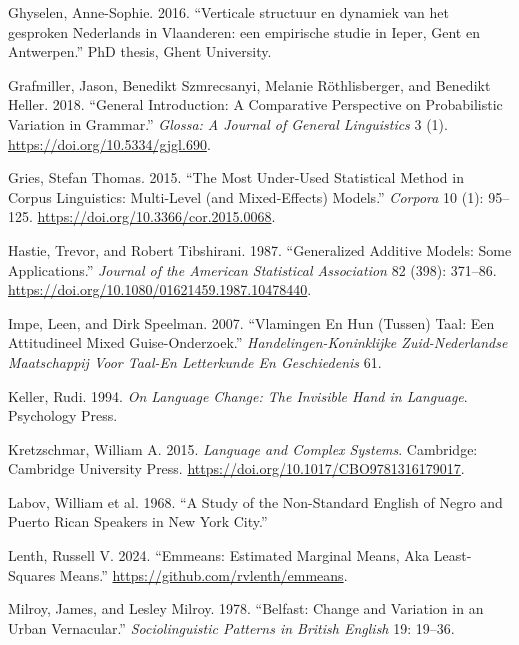 \documentclass[
  letterpaper,
  DIV=11,
  numbers=noendperiod,
  oneside]{scrartcl}
\newlength{\cslhangindent}
\newenvironment{CSLReferences}[2] %
 {\begin{list}{}{%
  \setlength{\itemindent}{0pt}
  \setlength{\leftmargin}{0pt}
  \setlength{\parsep}{0pt}
  \ifodd #1
   \setlength{\leftmargin}{\cslhangindent}
   \setlength{\itemindent}{-1\cslhangindent}
  \fi
  \setlength{\itemsep}{#2\baselineskip}}}
 {\end{list}}
\begin{document}
\begin{CSLReferences}{1}{0}
Ghyselen, Anne-Sophie. 2016. {``{Verticale structuur en dynamiek van het
gesproken Nederlands in Vlaanderen: een empirische studie in Ieper, Gent
en Antwerpen}.''} PhD thesis, {Ghent University}.

Grafmiller, Jason, Benedikt Szmrecsanyi, Melanie Röthlisberger, and
Benedikt Heller. 2018. {``General Introduction: {A} Comparative
Perspective on Probabilistic Variation in Grammar.''} \emph{Glossa: A
Journal of General Linguistics} 3 (1).
\url{https://doi.org/10.5334/gjgl.690}.

Gries, Stefan Thomas. 2015. {``The Most Under-Used Statistical Method in
Corpus Linguistics: Multi-Level (and Mixed-Effects) Models.''}
\emph{Corpora} 10 (1): 95--125.
\url{https://doi.org/10.3366/cor.2015.0068}.

Hastie, Trevor, and Robert Tibshirani. 1987. {``Generalized {Additive}
{Models}: {Some} {Applications}.''} \emph{Journal of the American
Statistical Association} 82 (398): 371--86.
\url{https://doi.org/10.1080/01621459.1987.10478440}.

Impe, Leen, and Dirk Speelman. 2007. {``Vlamingen En Hun (Tussen) Taal:
{Een} Attitudineel Mixed Guise-Onderzoek.''}
\emph{Handelingen-Koninklijke Zuid-Nederlandse Maatschappij Voor Taal-En
Letterkunde En Geschiedenis} 61.

Keller, Rudi. 1994. \emph{On {Language} {Change}: {The} {Invisible}
{Hand} in {Language}}. Psychology Press.

Kretzschmar, William A. 2015. \emph{Language and {Complex} {Systems}}.
Cambridge: Cambridge University Press.
\url{https://doi.org/10.1017/CBO9781316179017}.

Labov, William et al. 1968. {``A Study of the Non-Standard English of
Negro and Puerto Rican Speakers in New York City.''}

Lenth, Russell V. 2024. {``Emmeans: Estimated Marginal Means, Aka
Least-Squares Means.''} \url{https://github.com/rvlenth/emmeans}.

Milroy, James, and Lesley Milroy. 1978. {``Belfast: Change and Variation
in an Urban Vernacular.''} \emph{Sociolinguistic Patterns in British
English} 19: 19--36.


\end{CSLReferences}
\end{document}
